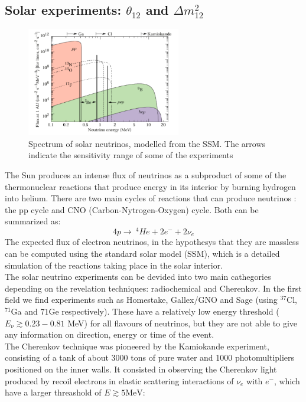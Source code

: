\documentclass[12pt,a4paper,openright,twoside]{report}
\begin{document}
\subsection{Solar experiments: $\theta_{12}$ and $\Delta m_{12}^2$}
\begin{figure}
	\centering
	\includegraphics[width=0.6\textwidth]{SSM.png}
	\caption{\label{SSM:fig} Spectrum of solar neutrinos, modelled from the SSM. The arrows indicate the sensitivity range of some of the experiments }
\end{figure}
The Sun produces an intense flux of neutrinos as a subproduct of some of the thermonuclear reactions that produce energy in its interior by burning hydrogen into helium. There are two main cycles of  reactions that can produce neutrinos : the pp cycle and CNO (Carbon-Nytrogen-Oxygen) cycle. Both can be summarized as:
\begin{equation}
4p \rightarrow \ ^4He+2 e^- + 2\nu_e
\end{equation}  
The expected flux of electron neutrinos, in the hypothesys that they are massless can be computed using the standard solar model (SSM), which is a detailed simulation of the reactions taking place in the solar interior.\\
The solar neutrino experiments can be devided into two main cathegories depending on the revelation techniques: radiochemical and Cherenkov. In the first field we find experiments such as Homestake, Gallex/GNO and Sage (using $^37$Cl, $^71$Ga and $71$Ge respectively). These have a relatively low energy threshold ($E_\nu\gtrsim 0.23-0.81$ MeV) for all flavours of neutrinos, but they are not able to give any information on  direction, energy or time of the event.\\
The Cherenkov technique was pioneered by the Kamiokande experiment, consisting of a tank of about 3000 tons of pure water and 1000 photomultipliers positioned on the inner walls. It consisted in observing the Cherenkov light produced by recoil electrons in  elastic scattering interactions of $\nu_e$ with $e^-$, which have a larger threashold of $E\gtrsim 5 \text{MeV}$:
\end{document}
